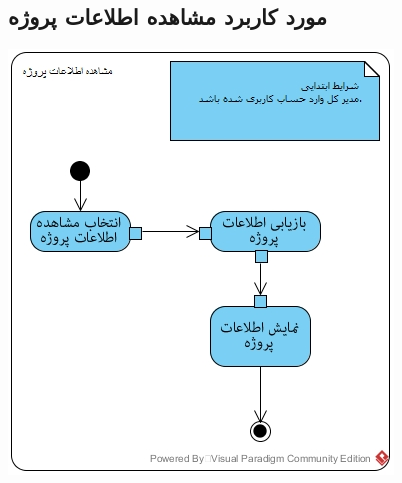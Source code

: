 \documentclass{article}
\begin{document}
\subsection*{مورد کاربرد مشاهده اطلاعات پروژه}
\vspace{2cm}
\begin{center}
\includegraphics[width=\textwidth]{ActivityDiagrams/31.jpg}
\end{center}
\newpage
\vspace{2cm}
\end{document}
